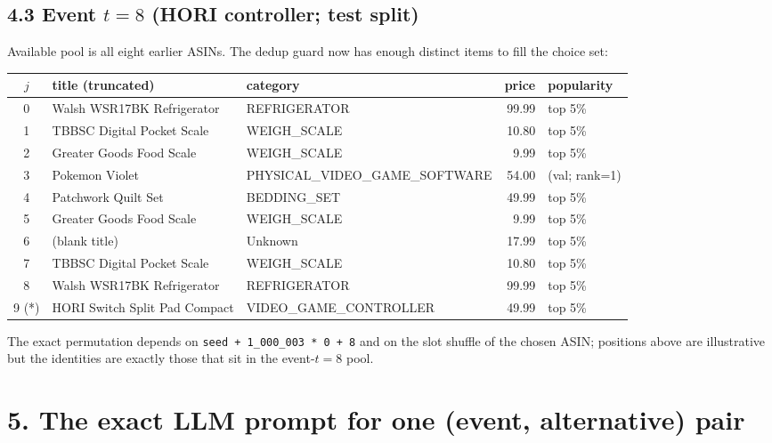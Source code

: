 \documentclass[11pt,a4paper]{article}
\begin{document}
\subsection*{4.3 Event $t = 8$ (HORI controller; test split)}

Available pool is all eight earlier ASINs. The dedup guard now has
enough distinct items to fill the choice set:

\begin{center}\footnotesize
\begin{tabular}{c l l r l}\toprule
$j$ & title (truncated) & category & price & popularity \\ \midrule
 0   & Walsh WSR17BK Refrigerator     & REFRIGERATOR                   & 99.99 & top 5\% \\
 1   & TBBSC Digital Pocket Scale     & WEIGH\_SCALE                   & 10.80 & top 5\% \\
 2   & Greater Goods Food Scale       & WEIGH\_SCALE                   &  9.99 & top 5\% \\
 3   & Pokemon Violet                 & PHYSICAL\_VIDEO\_GAME\_SOFTWARE & 54.00 & (val; rank=1) \\
 4   & Patchwork Quilt Set            & BEDDING\_SET                   & 49.99 & top 5\% \\
 5   & Greater Goods Food Scale       & WEIGH\_SCALE                   &  9.99 & top 5\% \\
 6   & (blank title)                  & Unknown                        & 17.99 & top 5\% \\
 7   & TBBSC Digital Pocket Scale     & WEIGH\_SCALE                   & 10.80 & top 5\% \\
 8   & Walsh WSR17BK Refrigerator     & REFRIGERATOR                   & 99.99 & top 5\% \\
 9 (*)& HORI Switch Split Pad Compact & VIDEO\_GAME\_CONTROLLER        & 49.99 & top 5\% \\
\bottomrule
\end{tabular}\end{center}

The exact permutation depends on
\texttt{seed + 1\_000\_003 * 0 + 8} and on the slot shuffle of the
chosen ASIN; positions above are illustrative but the identities are
exactly those that sit in the event-$t=8$ pool.

\section*{5. The exact LLM prompt for one (event, alternative) pair}
\end{document}
